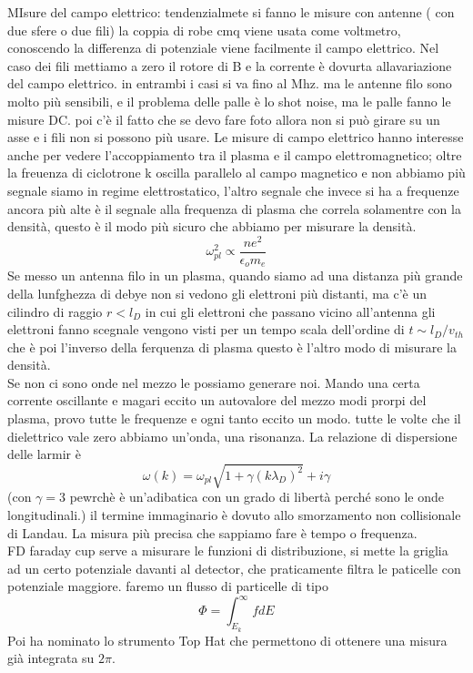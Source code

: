 \documentclass{book}
\begin{document}
MIsure del campo elettrico:
tendenzialmete si fanno le misure con antenne ( con due sfere o  due fili)   
la coppia di robe cmq viene usata come voltmetro, conoscendo la differenza di potenziale viene facilmente il campo elettrico.  Nel caso dei fili mettiamo a zero il rotore di B e la corrente è dovurta allavariazione del campo elettrico. in entrambi i casi si va fino al Mhz. ma le antenne filo sono molto più sensibili, e il problema delle palle è lo shot noise, ma le palle fanno le misure DC. poi c'è il fatto che se devo fare foto allora non si può girare su un asse e i fili non si possono più usare. Le misure di campo elettrico hanno interesse anche per vedere l'accoppiamento tra il plasma e il campo elettromagnetico; oltre la freuenza di ciclotrone k oscilla parallelo al campo magnetico e non abbiamo più segnale siamo in regime elettrostatico, l'altro segnale che invece si ha a frequenze ancora più alte è il segnale alla frequenza di plasma che correla solamentre con la densità, questo è il modo più sicuro che abbiamo per misurare la densità. 
\[\omega_{pl}^2\propto \frac{ne^2}{\epsilon_om_e}\] Se messo un antenna filo in un plasma, quando siamo ad una distanza più grande della lunfghezza di debye non si vedono gli elettroni più distanti, ma c'è un cilindro di raggio $r<l_D$ in cui gli elettroni che passano vicino all'antenna gli elettroni fanno scegnale vengono visti per un tempo scala dell'ordine di $t\sim l_D/v_{th}$  che è poi l'inverso della ferquenza di plasma questo è l'altro modo di misurare la densità. \\Se non ci sono onde nel mezzo le possiamo generare noi. Mando una certa corrente oscillante e magari eccito un autovalore del mezzo modi prorpi del plasma, provo tutte le frequenze e ogni tanto eccito un modo. tutte le volte che il dielettrico vale zero abbiamo un'onda,  una risonanza. 
La relazione di dispersione delle larmir è \[\omega(k)=\omega_{pl}\sqrt{1+\gamma(k\lambda_D)^2}+i\gamma\] 
(con $\gamma=3$ pewrchè è un'adibatica con un grado di libertà perché  sono le onde longitudinali.) il termine immaginario è dovuto allo smorzamento non collisionale di Landau. La misura più precisa che sappiamo fare è tempo o frequenza.  \\FD faraday cup serve a misurare le funzioni di distribuzione, si mette la griglia ad un certo potenziale davanti al detector, che praticamente filtra le paticelle con potenziale maggiore. faremo un flusso di particelle di tipo \[\Phi=\int_{ E_k}^\infty fdE\] Poi ha nominato lo strumento Top Hat che permettono di ottenere una misura già integrata su $2\pi$.
\end{document}
